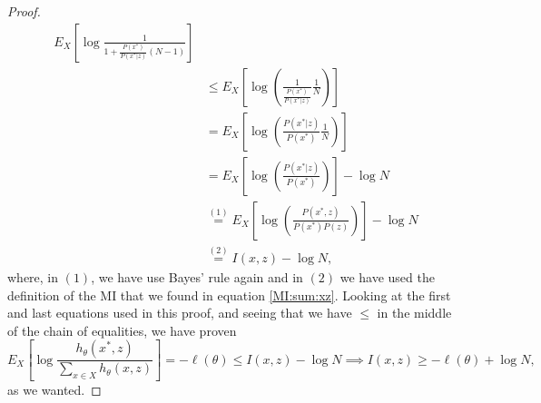 \begin{proof}
\begin{align*}
E_X\left[ \log \frac{1}{ 1+ \frac{P(x^*)}{P(x^*|z)}(N-1)}\right] \\
& \leq E_X\left[ \log\left(\frac{1}{\frac{P(x^*)}{P(x^*|z)}}\frac{1}{N}\right)\right]\\
& = E_X\left[ \log\left(\frac{P(x^*|z)}{P(x^*)} \frac{1}{N}\right)\right]\\
& = E_X \left[ \log\left(\frac{P(x^*|z)}{P(x^*)}\right)\right] - \log N \\
& \stackrel{(1)}{=} E_X \left[ \log\left(\frac{P(x^*,z)}{P(x^*)P(z)}\right)\right] - \log N\\
& \stackrel{(2)}{=} I(x,z) - \log N,
\end{align*}
where, in $(1)$, we have use Bayes' rule again and in $(2)$ we have used the definition of the MI that we found in equation \ref{MI:sum:xz}. Looking at the first and last equations used in this proof, and seeing that we have $\leq$ in the middle of the chain of equalities, we have proven
\[
    E_X \left[ \log \frac{h_\theta(x^*,z)}{\sum_{x \in X}h_\theta(x,z)}\right] = - \ell (\theta) \leq I(x,z) - \log N \implies I(x,z) \geq -\ell(\theta)+ \log N,
\]
as we wanted.   
\end{proof}


